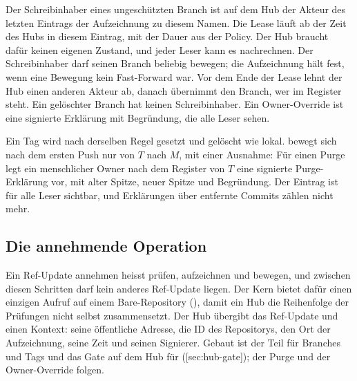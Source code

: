 Der Schreibinhaber eines ungeschützten Branch ist auf dem Hub der Akteur des letzten Eintrags der
Aufzeichnung zu diesem Namen.
Die Lease läuft ab der Zeit des Hubs in diesem Eintrag, mit der Dauer aus der Policy.
Der Hub braucht dafür keinen eigenen Zustand, und jeder Leser kann es nachrechnen.
Der Schreibinhaber darf seinen Branch beliebig bewegen; die Aufzeichnung hält fest, wenn eine
Bewegung kein Fast-Forward war.
Vor dem Ende der Lease lehnt der Hub einen anderen Akteur ab, danach übernimmt den Branch, wer
im Register steht.
Ein gelöschter Branch hat keinen Schreibinhaber.
Ein Owner-Override ist eine signierte Erklärung mit Begründung, die alle Leser sehen.

Ein Tag wird nach derselben Regel gesetzt und gelöscht wie lokal.
 bewegt sich nach dem ersten Push nur von $T$ nach $M$, mit einer Ausnahme:
Für einen Purge legt ein menschlicher Owner nach dem Register von $T$ eine signierte
Purge-Erklärung vor, mit alter Spitze, neuer Spitze und Begründung.
Der Eintrag ist für alle Leser sichtbar, und Erklärungen über entfernte Commits zählen nicht
mehr.

\subsection[sec:accept-ref-update]{Die annehmende Operation}

Ein Ref-Update annehmen heisst prüfen, aufzeichnen und bewegen, und zwischen diesen Schritten
darf kein anderes Ref-Update liegen.
Der Kern bietet dafür einen einzigen Aufruf auf einem Bare-Repository
(), damit ein Hub die Reihenfolge der Prüfungen nicht selbst
zusammensetzt.
Der Hub übergibt das Ref-Update und einen Kontext: seine öffentliche Adresse, die ID des
Repositorys, den Ort der Aufzeichnung, seine Zeit und seinen Signierer.
Gebaut ist der Teil für Branches und Tags und das Gate auf dem Hub für 
([sec:hub-gate]); der Purge und der Owner-Override folgen.

